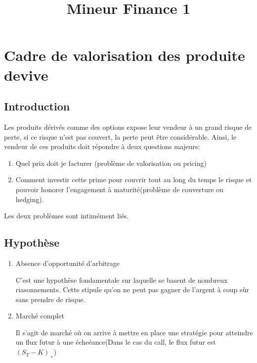 \documentclass{article}
\title{Mineur Finance 1}
\theoremstyle{plain}
\theoremstyle{definition}
\begin{document}
\maketitle

\tableofcontents
\pagebreak

\section{Cadre de valorisation des produite devive}
\subsection{Introduction}
Les produits d\'eriv\'es comme des options expose leur vendeur \`a un grand risque de perte, si ce risque n'est pas couvert, la perte peut \^etre consid\'erable. Ainsi, le vendeur de ces produits doit r\'epondre \`a deux questions majeurs:
\begin{enumerate}
	\item Quel prix doit je facturer (probl\`eme de valorisation ou pricing)
	\item Comment investir cette prime pour couvrir tout au long du temps le risque et pouvoir honorer l'engagement \`a maturit\'e(probl\`eme de couverture ou hedging).
\end{enumerate}

Les deux probl\`emes sont intim\'ement li\'es.
 
\subsection{Hypoth\`ese}
\begin{enumerate}
	\item Absence d'opportunit\'e d'arbitrage
	
	C'est une hypoth\`ese fondamentale sur laquelle se basent de nombreux riasonnements. Cette stipule qu'on ne peut pas gagner de l'argent \`a coup s\^ur sans prendre de risque.
	
	\item March\'e complet
	
	Il s'agit de march\'e o\`u on arrive \`a mettre en place une strat\'egie pour atteindre un flux futur \`a une \'eche\'eance(Dans le cas du call, le flux futur est $(S_T-K)_+$)
\end{enumerate}
\end{document}
